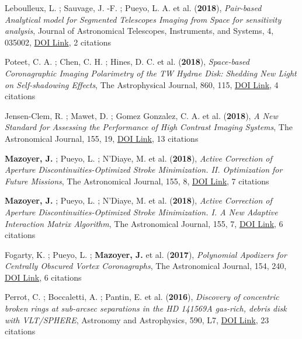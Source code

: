 \documentclass[11pt]{article}
\begin{document}
\begin{etaremune}
\item Leboulleux, L. ; Sauvage, J. -F. ; Pueyo, L. A. et al. ({\bf2018}), {\it Pair-based Analytical model for Segmented Telescopes Imaging from Space for sensitivity analysis}, Journal of Astronomical Telescopes, Instruments, and Systems, 4, 035002, \href{https://doi.org/10.1117/1.JATIS.4.3.035002}{DOI Link}, 2 citations

\item Poteet, C. A. ; Chen, C. H. ; Hines, D. C. et al. ({\bf2018}), {\it Space-based Coronagraphic Imaging Polarimetry of the TW Hydrae Disk: Shedding New Light on Self-shadowing Effects}, The Astrophysical Journal, 860, 115, \href{https://doi.org/10.3847/1538-4357/aac2e4}{DOI Link}, 4 citations

\item Jensen-Clem, R. ; Mawet, D. ; Gomez Gonzalez, C. A. et al. ({\bf2018}), {\it A New Standard for Assessing the Performance of High Contrast Imaging Systems}, The Astronomical Journal, 155, 19, \href{https://doi.org/10.3847/1538-3881/aa97e4}{DOI Link}, 13 citations

\item {\bf Mazoyer, J.} ; Pueyo, L. ; N'Diaye, M. et al. ({\bf2018}), {\it Active Correction of Aperture Discontinuities-Optimized Stroke Minimization. II. Optimization for Future Missions}, The Astronomical Journal, 155, 8, \href{https://doi.org/10.3847/1538-3881/aa91d7}{DOI Link}, 7 citations

\item {\bf Mazoyer, J.} ; Pueyo, L. ; N'Diaye, M. et al. ({\bf2018}), {\it Active Correction of Aperture Discontinuities-Optimized Stroke Minimization. I. A New Adaptive Interaction Matrix Algorithm}, The Astronomical Journal, 155, 7, \href{https://doi.org/10.3847/1538-3881/aa91cf}{DOI Link}, 6 citations

\item Fogarty, K. ; Pueyo, L. ; {\bf Mazoyer, J.} et al. ({\bf2017}), {\it Polynomial Apodizers for Centrally Obscured Vortex Coronagraphs}, The Astronomical Journal, 154, 240, \href{https://doi.org/10.3847/1538-3881/aa9063}{DOI Link}, 6 citations

\item Perrot, C. ; Boccaletti, A. ; Pantin, E. et al. ({\bf2016}), {\it Discovery of concentric broken rings at sub-arcsec separations in the HD 141569A gas-rich, debris disk with VLT/SPHERE}, Astronomy and Astrophysics, 590, L7, \href{https://doi.org/10.1051/0004-6361/201628396}{DOI Link}, 23 citations


\end{etaremune}
\end{document}
